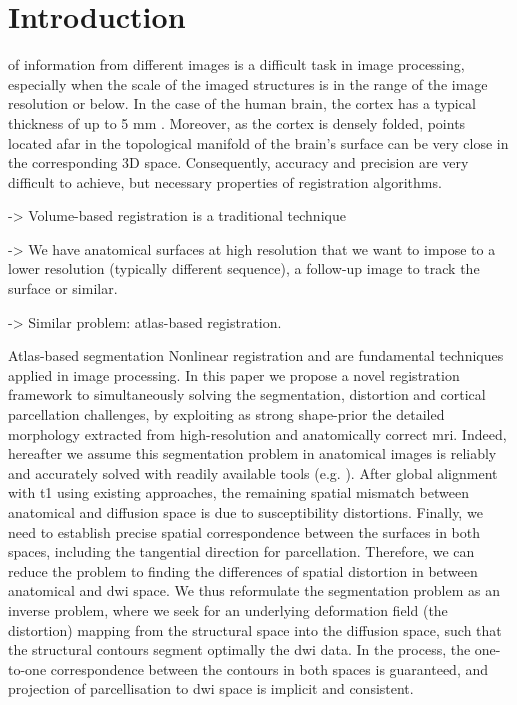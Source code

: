 \section{Introduction}
\label{sec:introduction}

 of information from different images is a difficult
  task in image processing, especially when the scale of the imaged structures
  is in the range of the image resolution or below.
In the case of the human brain, the cortex has a typical thickness of up to 5 mm
  \citep{fischl_measuring_2000}.
Moreover, as the cortex is densely folded, points located afar in the topological
  manifold of the brain's surface can be very close in the corresponding 3D space.
Consequently, accuracy and precision are very difficult to achieve, but necessary properties
  of registration algorithms.

-> Volume-based registration is a traditional technique

-> We have anatomical surfaces at high resolution that we want to impose to a
lower resolution (typically different sequence), a follow-up image to track the surface
or similar.

-> Similar problem: atlas-based registration.

Atlas-based segmentation Nonlinear registration and  are fundamental techniques applied in
  image processing.
In this paper we propose a novel registration framework to simultaneously
solving the segmentation, distortion and cortical parcellation challenges,
by exploiting as strong shape-prior the detailed morphology extracted
from high-resolution and anatomically correct \gls{mri}.
Indeed, hereafter
we assume this segmentation problem in anatomical images is reliably and
accurately solved with readily available tools (e.g.
\citep{fischl_freesurfer_2012}).
After global alignment with \gls{t1} using existing approaches, the remaining
spatial mismatch between anatomical and diffusion space is due to susceptibility
distortions.
Finally, we need to establish precise spatial correspondence between the
surfaces in both spaces, including the tangential direction for parcellation.
Therefore, we can reduce the problem to finding the differences of spatial
distortion in between anatomical and \gls{dwi} space.
We thus reformulate the segmentation problem as an inverse problem, where we
seek for an underlying deformation field (the distortion) mapping
from the structural space into the diffusion space, such that the structural
contours segment optimally the \gls{dwi} data.
In the process, the one-to-one
correspondence between the contours in both spaces is guaranteed, and projection
of parcellisation to \gls{dwi} space is implicit and consistent.

